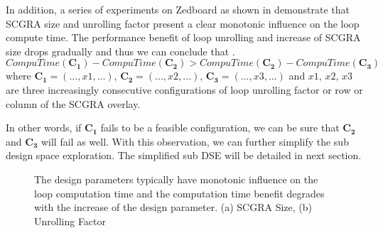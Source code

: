 In addition, a series of experiments on Zedboard \cite{zedboard} as 
shown in  demonstrate that SCGRA size and 
unrolling factor present a clear monotonic influence on the 
loop compute time. The performance benefit of loop unrolling and 
increase of SCGRA size drops gradually and thus we can conclude that .
\begin{equation} \label{eq:observation}
    CompuTime(\bm{C_1})-CompuTime(\bm{C_2}) > CompuTime(\bm{C_2})-CompuTime(\bm{C_3})
\end{equation}
where $\bm{C_1}=(...,x1,...)$, $\bm{C_2}=(...,x2,...)$, $\bm{C_3}=(...,x3,...)$ and
$x1$, $x2$, $x3$ are three increasingly consecutive configurations of loop unrolling 
factor or row or column of the SCGRA overlay.

In other words, if $\bm{C_1}$ fails to be a feasible configuration, we can be 
sure that $\bm{C_2}$ and $\bm{C_3}$ will fail as well. With this observation, 
we can further simplify the sub design space exploration. The simplified sub 
DSE will be detailed in next section.

\begin{figure}[tb]
    \centering
    \qquad
    \caption{The design parameters typically have monotonic influence on the
        loop computation time and the computation time benefit degrades with 
        the increase of the design parameter. (a) SCGRA Size, (b) Unrolling Factor}
    \label{fig:observation}
  \end{figure}



